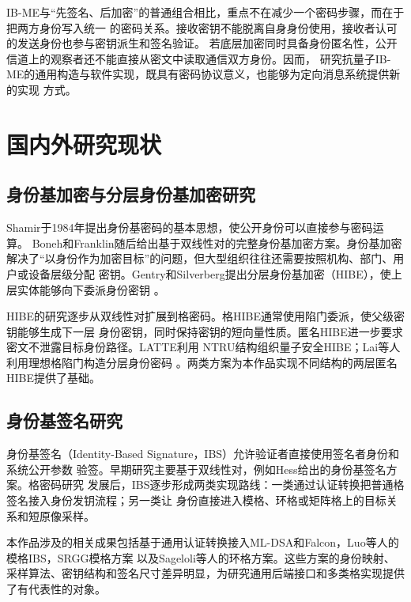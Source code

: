 IB-ME与“先签名、后加密”的普通组合相比，重点不在减少一个密码步骤，而在于把两方身份写入统一
的密码关系。接收密钥不能脱离自身身份使用，接收者认可的发送身份也参与密钥派生和签名验证。
若底层加密同时具备身份匿名性，公开信道上的观察者还不能直接从密文中读取通信双方身份。因而，
研究抗量子IB-ME的通用构造与软件实现，既具有密码协议意义，也能够为定向消息系统提供新的实现
方式。

\section{国内外研究现状}

\subsection{身份基加密与分层身份基加密研究}

Shamir于1984年提出身份基密码的基本思想，使公开身份可以直接参与密码运算\cite{shamir1984}。
Boneh和Franklin随后给出基于双线性对的完整身份基加密方案\cite{bonehfranklin2003}。身份基加密
解决了“以身份作为加密目标”的问题，但大型组织往往还需要按照机构、部门、用户或设备层级分配
密钥。Gentry和Silverberg提出分层身份基加密（HIBE），使上层实体能够向下委派身份密钥
\cite{gentrysilverberg2002}。

HIBE的研究逐步从双线性对扩展到格密码。格HIBE通常使用陷门委派，使父级密钥能够生成下一层
身份密钥，同时保持密钥的短向量性质。匿名HIBE进一步要求密文不泄露目标身份路径。LATTE利用
NTRU结构组织量子安全HIBE\cite{zhao2024latte}；Lai等人利用理想格陷门构造分层身份密码
\cite{lai2015trapdoors}。两类方案为本作品实现不同结构的两层匿名HIBE提供了基础。

\subsection{身份基签名研究}

身份基签名（Identity-Based Signature，IBS）允许验证者直接使用签名者身份和系统公开参数
验签。早期研究主要基于双线性对，例如Hess给出的身份基签名方案\cite{hess2003ibs}。格密码研究
发展后，IBS逐步形成两类实现路线：一类通过认证转换把普通格签名接入身份发钥流程；另一类让
身份直接进入模格、环格或矩阵格上的目标关系和短原像采样。

本作品涉及的相关成果包括基于通用认证转换接入ML-DSA和Falcon\cite{galindo2006ibs,
nist2024fips204,falcon2020}，Luo等人的模格IBS\cite{luo2024ibs}，SRGG模格方案
\cite{jia2025ibs}以及Sageloli等人的环格方案\cite{sageloli2023ibs}。这些方案的身份映射、
采样算法、密钥结构和签名尺寸差异明显，为研究通用后端接口和多类格实现提供了有代表性的对象。

